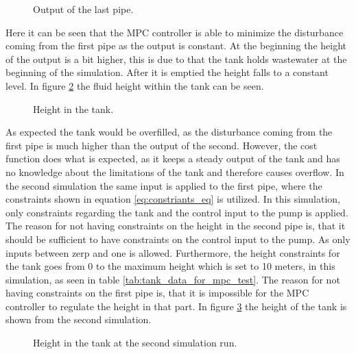 \begin{figure}[H]
 \centering
 
\caption{Output of the last pipe.}
\label{fig:MPC_test_output_first_test}
\end{figure}

Here it can be seen that the MPC controller is able to minimize the disturbance coming from the first pipe as the output is constant. At the beginning the height of the output is a bit higher, this is due to that the tank holds wastewater at the beginning of the simulation. After it is emptied the height falls to a constant level. In figure \ref{fig:tank_height_first_test} the fluid height within the tank can be seen.  

\begin{figure}[H]
 \centering
 
\caption{Height in the tank.}
\label{fig:tank_height_first_test}
\end{figure}

As expected the tank would be overfilled, as the disturbance coming from the first pipe is much higher than the output of the second. However, the cost function does what is expected, as it keeps a steady output of the tank and has no knowledge about the limitations of the tank and therefore causes overflow. In the second simulation the same input is applied to the first pipe, where the constraints shown in equation \ref{eq:constriants_eq} is utilized. In this simulation, only constraints regarding the tank and the control input to the pump is applied. The reason for not having constraints on the height in the second pipe is, that it should be sufficient to have constraints on the control input to the pump. As only inputs between zerp and one is allowed. 
Furthermore, the height constraints for the tank goes from 0 to the maximum height which is set to 10 meters, in this simulation, as seen in table \ref{tab:tank_data_for_mpc_test}. The reason for not having constraints on the first pipe is, that it is impossible for the MPC controller to regulate the height in that part. In figure \ref{fig:tank_height_second_test_with_constraints} the height of the tank is shown from the second simulation.        


\begin{figure}[H]
 \centering
 
\caption{Height in the tank at the second simulation run.}
\label{fig:tank_height_second_test_with_constraints}
\end{figure}

